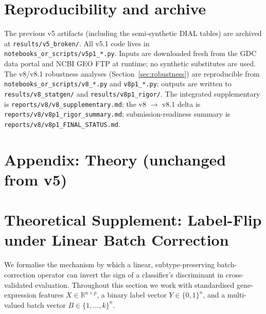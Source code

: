 \documentclass[11pt,a4paper]{article}
\begin{document}
\section{Reproducibility and archive}
The previous v5 artifacts (including the semi-synthetic DIAL tables) are archived at \texttt{results/v5\_broken/}. All v5.1 code lives in \texttt{notebooks\_or\_scripts/v5p1\_*.py}. Inputs are downloaded fresh from the GDC data portal and NCBI GEO FTP at runtime; no synthetic substitutes are used. The v8/v8.1 robustness analyses (Section~\ref{sec:robustness}) are reproducible from \texttt{notebooks\_or\_scripts/v8\_*.py} and \texttt{v8p1\_*.py}; outputs are written to \texttt{results/v8\_statgen/} and \texttt{results/v8p1\_rigor/}. The integrated supplementary is \texttt{reports/v8/v8\_supplementary.md}; the v8 $\to$ v8.1 delta is \texttt{reports/v8/v8p1\_rigor\_summary.md}; submission-readiness summary is \texttt{reports/v8/v8p1\_FINAL\_STATUS.md}.
\section*{Appendix: Theory (unchanged from v5)}

\section{Theoretical Supplement: Label-Flip under Linear Batch Correction}
\label{sec:dial-theory}

We formalise the mechanism by which a linear, subtype-preserving
batch-correction operator can invert the sign of a classifier's discriminant
in cross-validated evaluation. Throughout this section we work with
standardised gene-expression features $X \in \mathbb{R}^{n \times p}$, a
binary label vector $Y \in \{0,1\}^{n}$, and a multi-valued batch vector
$B \in \{1,\dots,k\}^{n}$.
\end{document}
